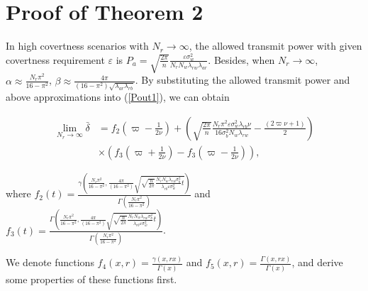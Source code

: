 \documentclass[conference]{IEEEtran}
\begin{document}
\section{Proof of Theorem 2}\label{proof_theorem5}
In high covertness scenarios with $N_r \to \infty$, the allowed transmit power with given covertness requirement $\varepsilon$ is  ${P_a} = \sqrt {\frac{{2\pi }}{n}} \frac{{\varepsilon \sigma _w^2}}{{{N_r}{N_w}{\lambda _{rw}}{\lambda _{ar}}}}$. Besides, when $N_r \to \infty$, $\alpha  \approx \frac{{{N_r}{\pi ^2}}}{{16 - {\pi ^2}}}$, $\beta  \approx \frac{{4\pi }}{{\left( {{{16 - }}{\pi ^2}} \right)\sqrt {{\lambda _{ar}}{\lambda _{rb}}} }}$. By substituting the allowed transmit power and above approximations into (\ref{Pout1}), we can obtain
\begin{small}
\begin{equation}
	\begin{aligned}
		\mathop {\lim }\limits_{{N_r} \to \infty } \!{{\bar \delta }}\! &=\! {f_2}(\varpi  \!-\! \frac{1}{{2\nu }}) \!+\! \left(\!\! {\sqrt {\frac{{2\pi }}{n}} \frac{{{N_r}{\pi ^2}\varepsilon \sigma _w^2{\lambda _{rb}}\nu }}{{16\sigma _b^2{N_w}{\lambda _{rw}}}} \!-\! \frac{{(2\varpi \nu  \!+\! 1)}}{2}} \!\!\right)\!\\
		&\times \left( {{f_3}\left( {\varpi  + \frac{1}{{2\nu }}} \right) \!-\! {f_3}\left( {\varpi  - \frac{1}{{2\nu }}} \right)} \right),
	\end{aligned}
\end{equation}
\end{small}
where ${f_2}(t) = \frac{{\gamma \left( {\frac{{{N_r}{\pi ^2}}}{{16 - {\pi ^2}}},\frac{{4\pi }}{{\left( {{{16 - }}{\pi ^2}} \right)}}\sqrt {\sqrt {\frac{n}{{2\pi }}} \frac{{{N_r}{N_w}{\lambda _{rw}}\sigma _b^2}}{{{\lambda _{rb}}\varepsilon \sigma _w^2}}t} } \right)}}{{\Gamma \left( {\frac{{{N_r}{\pi ^2}}}{{16 - {\pi ^2}}}} \right)}}$ and ${f_3}(t) = \frac{{\Gamma \left( {\frac{{{N_r}{\pi ^2}}}{{16 - {\pi ^2}}},\frac{{4\pi }}{{\left( {{{16 - }}{\pi ^2}} \right)}}\sqrt {\sqrt {\frac{n}{{2\pi }}} \frac{{{N_r}{N_w}{\lambda _{rw}}\sigma _b^2}}{{{\lambda _{rb}}\varepsilon \sigma _w^2}}t} } \right)}}{{\Gamma \left( {\frac{{{N_r}{\pi ^2}}}{{16 - {\pi ^2}}}} \right)}}$.

We denote functions $f_4(x,r) \!=\! \frac{{\gamma \left( {x,rx} \right)}}{{\Gamma \left( x \right)}}$ and ${f_5}(x,r) \!=\! \frac{{\Gamma \left( {x,rx} \right)}}{{\Gamma \left( x \right)}}$, and derive some properties of these functions first.
\end{document}
